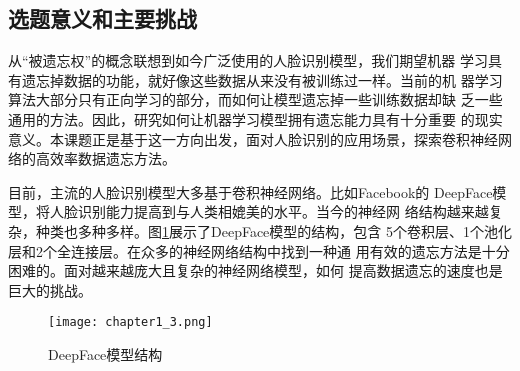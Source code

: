 

\subsection{选题意义和主要挑战}
从“被遗忘权”的概念联想到如今广泛使用的人脸识别模型，我们期望机器
学习具有遗忘掉数据的功能，就好像这些数据从来没有被训练过一样。当前的机
器学习算法大部分只有正向学习的部分，而如何让模型遗忘掉一些训练数据却缺
乏一些通用的方法。因此，研究如何让机器学习模型拥有遗忘能力具有十分重要
的现实意义。本课题正是基于这一方向出发，面对人脸识别的应用场景，探索卷积神经网络的高效率数据遗忘方法。

目前，主流的人脸识别模型大多基于卷积神经网络\cite{GUO2019102805}。比如Facebook的
DeepFace模型\cite{deepface2014}，将人脸识别能力提高到与人类相媲美的水平。当今的神经网
络结构越来越复杂，种类也多种多样。图\ref{fig:chapter1_3}展示了DeepFace模型的结构，包含
5个卷积层、1个池化层和2个全连接层。在众多的神经网络结构中找到一种通
用有效的遗忘方法是十分困难的。面对越来越庞大且复杂的神经网络模型，如何
提高数据遗忘的速度也是巨大的挑战。
\begin{figure}
  \centering
  \texttt{[image: chapter1\_3.png]}
  \caption{DeepFace模型结构\cite{deepface2014}}
  \label{fig:chapter1_3}
\end{figure}

